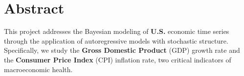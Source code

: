 \documentclass{Configuration_Files/PoliMi3i_thesis}
\begin{document}


\pagestyle{empty} %
\frontmatter %




\startpreamble
\setcounter{page}{1} %

\chapter*{Abstract} 
This project addresses the Bayesian modeling of \textbf{U.S.} economic time series through the application of autoregressive models with stochastic structure. Specifically, we study the \textbf{Gross Domestic Product} (GDP) growth rate and the \textbf{Consumer Price Index} (CPI) inflation rate, two critical indicators of macroeconomic health.
\end{document}
